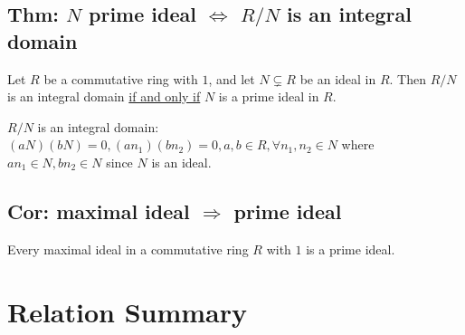 \documentclass[11pt]{elegantbook}
\begin{document}
\subsection{Thm: $N$ prime ideal $\Leftrightarrow$ $R/N$ is an integral domain}
\begin{theorem}
    Let $R$ be a commutative ring with $1$, and let $N\subsetneq R$ be an ideal in $R$. Then $R/N$ is an integral domain \underline{if and only if} $N$ is a prime ideal in $R$.
\end{theorem}
$R/N$ is an integral domain: $(aN)(bN)=0,(an_1)(bn_2)=0, a,b\in R, \forall n_1,n_2\in N$ where $an_1\in N,bn_2\in N$ since $N$ is an ideal.

\subsection{Cor: maximal ideal $\Rightarrow$ prime ideal}
\begin{corollary}
    Every maximal ideal in a commutative ring $R$ with $1$ is a prime ideal.
\end{corollary}

\section{Relation Summary}
\begin{center}
\end{center}
\end{document}
